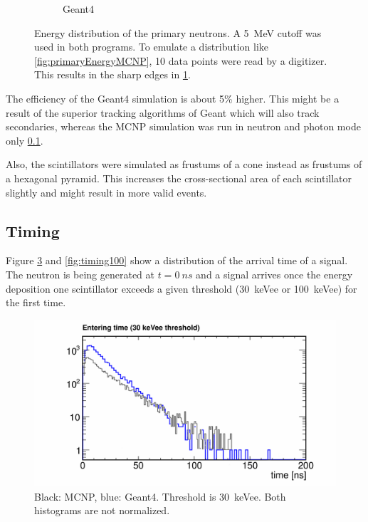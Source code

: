 \documentclass[12pt]{article}
\begin{document}
\begin{figure}[htbp]
\begin{subfigure}[t]{0.55\textwidth}
  		\caption{Geant4}
  		\label{fig:primaryEnergyGeant4}
  	\end{subfigure}
  	\caption{Energy distribution of the primary neutrons. A \SI{5}{MeV} cutoff was used in both programs. To emulate a distribution like  \ref{fig:primaryEnergyMCNP}, 10 data points were read by a digitizer. This results in the sharp edges in \ref{fig:primaryEnergyGeant4}.}
  	\label{fig_primaryEnergies}
  \end{figure}
  
 The efficiency of the Geant4 simulation is about 5\% higher. This might be a result of the superior tracking algorithms of Geant which will also track secondaries, whereas the MCNP simulation was run in neutron and photon mode only \ref{}. 
 
 Also, the scintillators were simulated as frustums of a cone instead as frustums of a hexagonal pyramid. This increases the cross-sectional area of each scintillator slightly and might result in more valid events.   
 
\subsection{Timing}

Figure \ref{fig:timing30} and \ref{fig:timing100} show a distribution of the arrival time of a signal. The neutron is being generated at $t=\SI{0}{ns}$ and a signal arrives once the energy deposition one scintillator exceeds a given threshold (\SI{30}{keVee} or \SI{100}{keVee}) for the first time.
 \begin{figure}[H]
 	     \includegraphics[trim = 0cm 0cm 0cm 1.1cm, clip, width=\textwidth]{pics/timing.pdf}
 	\caption{Black: MCNP, blue: Geant4. Threshold is \SI{30}{keVee}. Both histograms are not normalized.}
 	\label{fig:timing30}
 \end{figure}
\end{document}
